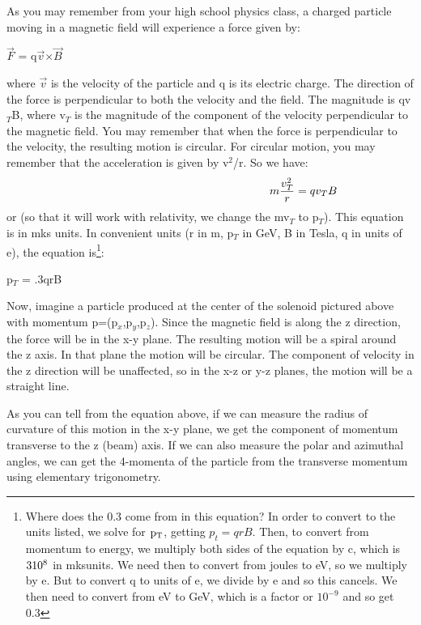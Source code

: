 As you may remember from your high school physics class, a charged particle moving in a magnetic field will experience a force given by:
\begin{center}$\vec{F}$ = q$\vec{v}$$\times$$\vec{B}$ \end{center}
 where $\vec{v}$ is the velocity of the particle and q is its electric charge. The direction of the force is perpendicular to both the velocity and the field. The magnitude is qv$_{T}$B, where v$_{T}$ is the magnitude of the component of the velocity perpendicular to the magnetic field. You may remember that when the force is perpendicular to the velocity, the resulting motion is circular.  For circular motion, you may remember that the acceleration is given by v$^{2}$/r. So we have:
\begin {equation} \hspace {58 mm}
m\dfrac{v_{T}^{2}}{r} = qv_{T}B
\end{equation}
or (so that it will work with relativity, we change the mv$_{T}$ to p$_{T}$). This equation is in mks units. In convenient units (r in m, p$_{T}$ in GeV, B in Tesla, q in units of e), the equation is\footnote{Where does the 0.3 come from in this equation?  In order to convert to the units listed, we solve for ${\rm p_T}$, getting $p_t = qrB$.  Then, to convert from momentum to energy, we multiply both sides of the equation by c, which is ${\rm 3 10^{8}}$ in mksunits.  We need then to convert from joules to eV, so we multiply by e. But to convert q to units of e, we divide by e and so this cancels.  We then need to convert from eV to GeV, which is a factor or ${10^{-9}}$ and so get 0.3}:

\begin{center} p$_{T}$ = .3qrB \end{center}

Now, imagine a particle produced at the center of the solenoid pictured above with momentum p=(p$_{x}$,p$_{y}$,p$_{z}$). Since the magnetic field is along the z direction, the force will be in the x-y plane. The resulting motion will be a spiral around the z axis. In that plane the motion will be circular.  The component of velocity in the z direction will be unaffected, so in the x-z or y-z planes, the motion will be a straight line.

As you can tell from the equation above, if we can measure the radius of curvature of this motion in the x-y plane, we get the component of momentum transverse to the z (beam) axis.  If we can also measure the polar and azimuthal angles, we can get the 4-momenta of the particle from the transverse momentum using elementary trigonometry.

